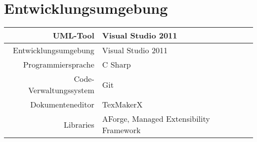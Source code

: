 \chapter{Entwicklungsumgebung}
\begin{tabular}{r|l}
UML-Tool & Visual Studio 2011 \\ 
\hline 
Entwicklungsumgebung & Visual Studio 2011 \\ 
\hline 
Programmiersprache & C Sharp \\ 
\hline 
Code-Verwaltungssystem & Git \\ 
\hline 
Dokumenteneditor & TexMakerX \\ 
\hline 
Libraries & AForge, Managed Extensibility Framework \\ 
\end{tabular}